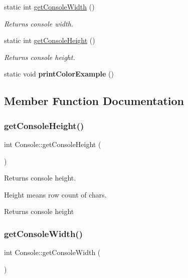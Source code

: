 \begin{DoxyCompactItemize}
static int \mbox{\hyperlink{class_console_ad8d4f4d8995f01c97ecb29da2460f7e4}{get\+Console\+Width}} ()
\begin{DoxyCompactList}\small\item\em Returns console width. \end{DoxyCompactList}\item 
static int \mbox{\hyperlink{class_console_ac4ec7d76d4dc49eb757728e98b2a1941}{get\+Console\+Height}} ()
\begin{DoxyCompactList}\small\item\em Returns console height. \end{DoxyCompactList}\item 
\mbox{\label{class_console_aa849da7a0a50a2b7439e5211cb07595f}} 
static void {\bfseries print\+Color\+Example} ()
\end{DoxyCompactItemize}


\subsection{Member Function Documentation}
\mbox{\label{class_console_ac4ec7d76d4dc49eb757728e98b2a1941}} 
\subsubsection{\texorpdfstring{getConsoleHeight()}{getConsoleHeight()}}
{\footnotesize\ttfamily int Console\+::get\+Console\+Height (\begin{DoxyParamCaption}{ }\end{DoxyParamCaption})\hspace{0.3cm}{\ttfamily [static]}}



Returns console height. 

Height means row count of chars. \begin{DoxyReturn}{Returns}
console height 
\end{DoxyReturn}
\mbox{\label{class_console_ad8d4f4d8995f01c97ecb29da2460f7e4}} 
\subsubsection{\texorpdfstring{getConsoleWidth()}{getConsoleWidth()}}
{\footnotesize\ttfamily int Console\+::get\+Console\+Width (\begin{DoxyParamCaption}{ }\end{DoxyParamCaption})\hspace{0.3cm}{\ttfamily [static]}}



